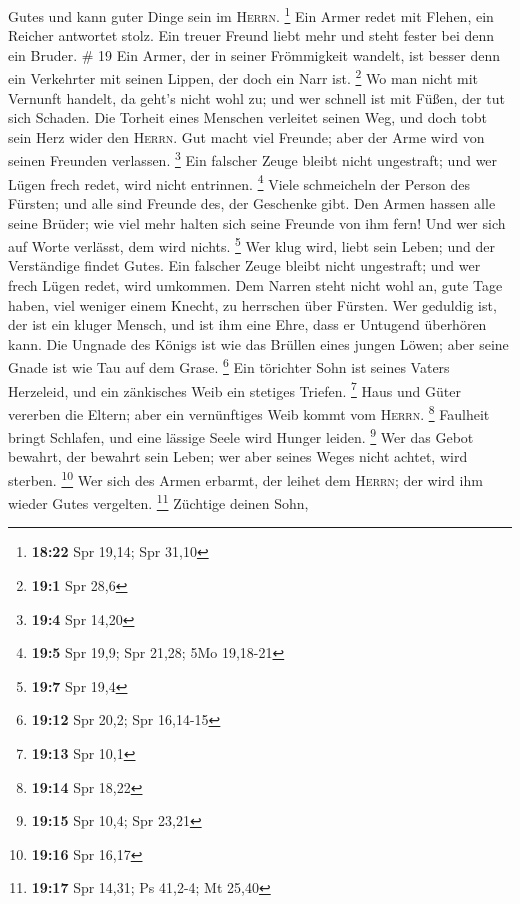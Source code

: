 Gutes und kann guter Dinge sein im \textsc{Herrn}. \footnote{\textbf{18:22}
  Spr 19,14; Spr 31,10}  Ein Armer redet mit Flehen, ein
Reicher antwortet stolz.  Ein treuer Freund liebt mehr
und steht fester bei denn ein Bruder. \# 19  Ein Armer,
der in seiner Frömmigkeit wandelt, ist besser denn ein Verkehrter mit
seinen Lippen, der doch ein Narr ist. \footnote{\textbf{19:1} Spr 28,6}
 Wo man nicht mit Vernunft handelt, da geht's nicht wohl
zu; und wer schnell ist mit Füßen, der tut sich Schaden. 
Die Torheit eines Menschen verleitet seinen Weg, und doch tobt sein Herz
wider den \textsc{Herrn}.  Gut macht viel Freunde; aber
der Arme wird von seinen Freunden verlassen. \footnote{\textbf{19:4} Spr
  14,20}  Ein falscher Zeuge bleibt nicht ungestraft; und
wer Lügen frech redet, wird nicht entrinnen. \footnote{\textbf{19:5} Spr
  19,9; Spr 21,28; 5Mo 19,18-21}  Viele schmeicheln der
Person des Fürsten; und alle sind Freunde des, der Geschenke gibt.
 Den Armen hassen alle seine Brüder; wie viel mehr halten
sich seine Freunde von ihm fern! Und wer sich auf Worte verlässt, dem
wird nichts. \footnote{\textbf{19:7} Spr 19,4}  Wer klug
wird, liebt sein Leben; und der Verständige findet Gutes. 
Ein falscher Zeuge bleibt nicht ungestraft; und wer frech Lügen redet,
wird umkommen.  Dem Narren steht nicht wohl an, gute Tage
haben, viel weniger einem Knecht, zu herrschen über Fürsten.
 Wer geduldig ist, der ist ein kluger Mensch, und ist ihm
eine Ehre, dass er Untugend überhören kann.  Die Ungnade
des Königs ist wie das Brüllen eines jungen Löwen; aber seine Gnade ist
wie Tau auf dem Grase. \footnote{\textbf{19:12} Spr 20,2; Spr 16,14-15}
 Ein törichter Sohn ist seines Vaters Herzeleid, und ein
zänkisches Weib ein stetiges Triefen. \footnote{\textbf{19:13} Spr 10,1}
 Haus und Güter vererben die Eltern; aber ein
vernünftiges Weib kommt vom \textsc{Herrn}. \footnote{\textbf{19:14} Spr
  18,22}  Faulheit bringt Schlafen, und eine lässige
Seele wird Hunger leiden. \footnote{\textbf{19:15} Spr 10,4; Spr 23,21}
 Wer das Gebot bewahrt, der bewahrt sein Leben; wer aber
seines Weges nicht achtet, wird sterben. \footnote{\textbf{19:16} Spr
  16,17}  Wer sich des Armen erbarmt, der leihet dem
\textsc{Herrn}; der wird ihm wieder Gutes vergelten. \footnote{\textbf{19:17}
  Spr 14,31; Ps 41,2-4; Mt 25,40}  Züchtige deinen Sohn,
